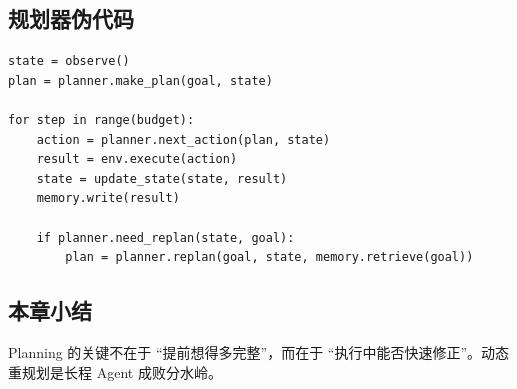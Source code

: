 \subsection{规划器伪代码}
\begin{lstlisting}[caption={一个简化的重规划循环，强调“偏差触发式更新”}]
state = observe()
plan = planner.make_plan(goal, state)

for step in range(budget):
    action = planner.next_action(plan, state)
    result = env.execute(action)
    state = update_state(state, result)
    memory.write(result)

    if planner.need_replan(state, goal):
        plan = planner.replan(goal, state, memory.retrieve(goal))
\end{lstlisting}

\subsection{本章小结}
Planning 的关键不在于 ``提前想得多完整''，而在于 ``执行中能否快速修正''。动态重规划是长程 Agent 成败分水岭。

